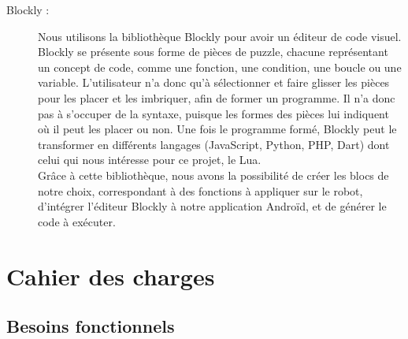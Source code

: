 \documentclass[12pt,francais]{report}
\begin{document}
\bigskip
\begin{description}
\item [Blockly :] Nous utilisons la bibliothèque Blockly \cite{ref2} pour avoir un éditeur de code visuel. Blockly se présente sous forme de pièces de puzzle, chacune représentant un concept de code, comme une fonction, une condition, une boucle ou une variable. L'utilisateur n'a donc qu'à sélectionner et faire glisser les pièces pour les placer et les  imbriquer, afin de former un programme. Il n'a donc pas à s'occuper de la syntaxe, puisque les formes des pièces lui indiquent où il peut les placer ou non. Une fois le programme formé, Blockly peut le transformer en différents langages (JavaScript, Python, PHP, Dart) dont celui qui nous intéresse pour ce projet, le Lua.\\
Grâce à cette bibliothèque, nous avons la possibilité de créer les blocs de notre choix, correspondant à des fonctions à appliquer sur le robot, d'intégrer l'éditeur Blockly à notre application Androïd, et de générer le code à exécuter.
\end{description}

\chapter*{Cahier des charges}

\section*{Besoins fonctionnels}
\end{document}

